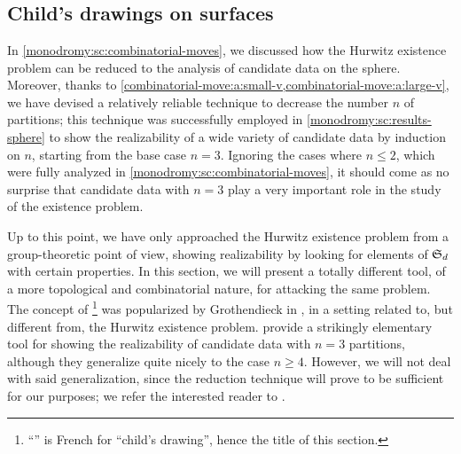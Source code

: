 \chapter{\texorpdfstring{\Dessins{}}{Dessins d'enfant}}

\section{Child's drawings on surfaces}

In \cref{monodromy:sc:combinatorial-moves}, we discussed how the Hurwitz existence problem can be reduced to the analysis of candidate data on the sphere. Moreover, thanks to \cref{combinatorial-move:a:small-v,combinatorial-move:a:large-v}, we have devised a relatively reliable technique to decrease the number $n$ of partitions; this technique was successfully employed in \cref{monodromy:sc:results-sphere} to show the realizability of a wide variety of candidate data by induction on $n$, starting from the base case $n=3$. Ignoring the cases where $n\le 2$, which were fully analyzed in \cref{monodromy:sc:combinatorial-moves}, it should come as no surprise that candidate data with $n=3$ play a very important role in the study of the existence problem.

Up to this point, we have only approached the Hurwitz existence problem from a group-theoretic point of view, showing realizability by looking for elements of $\symgroup[d]$ with certain properties. In this section, we will present a totally different tool, of a more topological and combinatorial nature, for attacking the same problem. The concept of \emph{\dessins{}}\footnote{``\emph{\Dessin{}}'' is French for ``child's drawing'', hence the title of this section.} was popularized by Grothendieck in \cite{grothendieck}, in a setting related to, but different from, the Hurwitz existence problem. \Dessins{} provide a strikingly elementary tool for showing the realizability of candidate data with $n=3$ partitions, although they generalize quite nicely to the case $n\ge 4$. However, we will not deal with said generalization, since the reduction technique will prove to be sufficient for our purposes; we refer the interested reader to .

